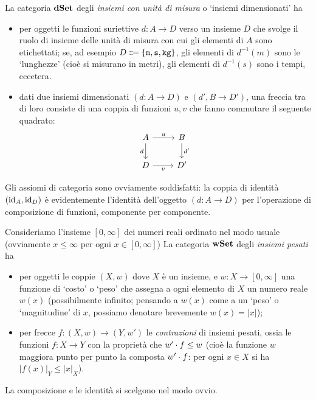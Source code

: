 \begin{example}\label{example_dimensionati}
 La categoria \(\mathbf{dSet}\) degli \emph{insiemi con unità di misura} o `insiemi dimensionati' ha
 \begin{itemize}
  \item per oggetti le funzioni suriettive \(d \colon A\to D\) verso un insieme \(D\) che svolge il ruolo di insieme delle unità di misura con cui gli elementi di \(A\) sono etichettati; se, ad esempio \(D \defeq  \{\texttt{m},\texttt{s},\texttt{kg}\}\), gli elementi di \(d^{-1}(m)\) sono le `lunghezze' (cioè si misurano in metri), gli elementi di \(d^{-1}(s)\) sono i tempi, eccetera.
  \item dati due insiemi dimensionati \((d \colon A\to D)\) e \((d', B\to D')\), una freccia tra di loro consiste di una coppia di funzioni \(u,v\) che fanno commutare il seguente quadrato:
        \[\begin{tikzcd}
          A\ar[r, "u"]\ar[d,"d"'] & B \ar[d, "d'"]\\
          D \ar[r, "v"']& D'
         \end{tikzcd}\]
 \end{itemize}
 Gli assiomi di categoria sono ovviamente soddisfatti: la coppia di identità \((\mathrm{id}_A,\mathrm{id}_D)\) è evidentemente l'identità dell'oggetto \((d \colon A\to D)\) per l'operazione di composizione di funzioni, componente per componente.
\end{example}
\begin{example}\label{example_pesati}
 Consideriamo l'insieme \([0,\infty]\) dei numeri reali ordinato nel modo usuale (ovviamente \(x\le \infty\) per ogni \(x\in [0,\infty]\)) La categoria \(\mathbf{wSet}\) degli \emph{insiemi pesati} ha
 \begin{itemize}
  \item per oggetti le coppie \((X,w)\) dove \(X\) è un insieme, e \(w \colon X \to [0,\infty]\) una funzione di `costo' o `peso' che assegna a ogni elemento di \(X\) un numero reale \(w(x)\) (possibilmente infinito; pensando a \(w(x)\) come a un `peso' o `magnitudine' di \(x\), possiamo denotare brevemente \(w(x)=|x|\));
  \item per frecce \(f \colon (X,w) \to (Y,w')\) le \emph{contrazioni} di insiemi pesati, ossia le funzioni \(f \colon X\to Y\) con la proprietà che \(w'\cdot f \le w\) (cioè la funzione \(w\) maggiora punto per punto la composta \(w'\cdot f\): per ogni \(x\in X\) si ha \(|f(x)|_Y \le |x|_X\)).
 \end{itemize}
 La composizione e le identità si scelgono nel modo ovvio.
\end{example}
